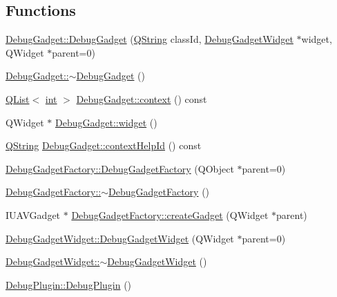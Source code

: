 \subsection*{Functions}
\begin{DoxyCompactItemize}
\item 
\hyperlink{group___debug_gadget_plugin_gae32cda168c382c01595bc348472e69f0}{Debug\-Gadget\-::\-Debug\-Gadget} (\hyperlink{group___u_a_v_objects_plugin_gab9d252f49c333c94a72f97ce3105a32d}{Q\-String} class\-Id, \hyperlink{class_debug_gadget_widget}{Debug\-Gadget\-Widget} $\ast$widget, Q\-Widget $\ast$parent=0)
\item 
\hyperlink{group___debug_gadget_plugin_gab1dfec6b8b4cb29fa466e6102d3096ac}{Debug\-Gadget\-::$\sim$\-Debug\-Gadget} ()
\item 
\hyperlink{class_q_list}{Q\-List}$<$ \hyperlink{ioapi_8h_a787fa3cf048117ba7123753c1e74fcd6}{int} $>$ \hyperlink{group___debug_gadget_plugin_gaaf1624068acedd32979ab08deddefe6e}{Debug\-Gadget\-::context} () const 
\item 
Q\-Widget $\ast$ \hyperlink{group___debug_gadget_plugin_ga08f35a753d418ed6e9d9594bcce8fee8}{Debug\-Gadget\-::widget} ()
\item 
\hyperlink{group___u_a_v_objects_plugin_gab9d252f49c333c94a72f97ce3105a32d}{Q\-String} \hyperlink{group___debug_gadget_plugin_ga123c9f10792e9dcd8f128da2be20f176}{Debug\-Gadget\-::context\-Help\-Id} () const 
\item 
\hyperlink{group___debug_gadget_plugin_ga48259f8b08f0767ab22c4b022643e134}{Debug\-Gadget\-Factory\-::\-Debug\-Gadget\-Factory} (Q\-Object $\ast$parent=0)
\item 
\hyperlink{group___debug_gadget_plugin_gadb2d9eecc3b92fc56cf849ffd7230e91}{Debug\-Gadget\-Factory\-::$\sim$\-Debug\-Gadget\-Factory} ()
\item 
I\-U\-A\-V\-Gadget $\ast$ \hyperlink{group___debug_gadget_plugin_ga24e00530d01c4d1874ac8395caa2370c}{Debug\-Gadget\-Factory\-::create\-Gadget} (Q\-Widget $\ast$parent)
\item 
\hyperlink{group___debug_gadget_plugin_ga67e29acbc33b5ca194215ea1c70e9e72}{Debug\-Gadget\-Widget\-::\-Debug\-Gadget\-Widget} (Q\-Widget $\ast$parent=0)
\item 
\hyperlink{group___debug_gadget_plugin_ga74a70926720377a2a71c0946408b8127}{Debug\-Gadget\-Widget\-::$\sim$\-Debug\-Gadget\-Widget} ()
\item 
\hyperlink{group___debug_gadget_plugin_ga20c99d3ead7ff85b7fedc4e18a1e9a8b}{Debug\-Plugin\-::\-Debug\-Plugin} ()
\item 

\end{DoxyCompactItemize}
